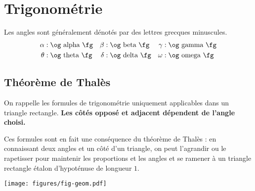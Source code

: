 \section{Trigonométrie}

Les angles sont généralement dénotés par des lettres grecques minuscules.
	\begin{align*}
		\alpha &: \text{\og alpha \fg} & \beta &: \text{\og beta \fg} & \gamma &: \text{\og gamma \fg} \\
		\theta &: \text{\og theta \fg} &  \delta &: \text{\og delta \fg} & \omega &: \text{\og omega \fg}
	\end{align*}



\subsection{Théorème de Thalès}

On rappelle les formules de trigonométrie uniquement applicables dans un triangle rectangle.
\warning\textbf{Les côtés opposé et adjacent dépendent de l'angle choisi.}



Ces formules sont en fait une conséquence du théorème de Thalès : en connaissant deux angles et un côté d'un triangle, on peut l'agrandir ou le rapetisser pour maintenir les proportions et les angles et se ramener à un triangle rectangle étalon d'hypoténuse de longueur $1$.

	\begin{center}
	\texttt{[image: figures/fig-geom.pdf]}
	\end{center}

